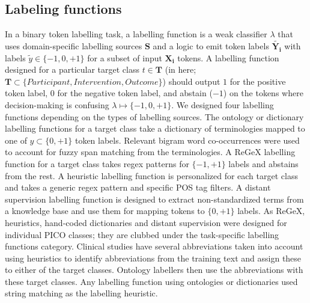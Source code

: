 \documentclass[10.7pt,]{article}
\begin{document}
\subsection{Labeling functions}\label{lfs}
%
In a binary token labelling task, a labelling function is a weak classifier $\lambda$ that uses domain-specific labelling sources $\bm{S}$ and a logic to emit token labels $ \widetilde{\bm{Y_{i}}}$ with labels $ \widetilde{y} \in \{-1, 0, +1\}$ for a subset of input $\bm{X_{i}}$ tokens.
A labelling function designed for a particular target class $t \in \bm{T}$ (in here; $\bm{T} \subset \{ Participant, Intervention, Outcome \} $) should output  $1$ for the positive token label, $0$ for the negative token label, and abstain ($-1$) on the tokens where decision-making is confusing $\lambda \mapsto \{-1, 0, +1\}$.
We designed four labelling functions depending on the types of labelling sources.
The ontology or dictionary labelling functions for a target class take a dictionary of terminologies mapped to one of $y \subset \{0, +1\} $ token labels.
Relevant bigram word co-occurrences were used to account for fuzzy span matching from the terminologies.
A ReGeX labelling function for a target class takes regex patterns for $\{-1, +1\}$ labels and abstains from the rest.
A heuristic labelling function is personalized for each target class and takes a generic regex pattern and specific POS tag filters.
A distant supervision labelling function is designed to extract non-standardized terms from a knowledge base and use them for mapping tokens to $\{0, +1\}$ labels.
As ReGeX, heuristics, hand-coded dictionaries and distant supervision were designed for individual PICO classes; they are clubbed under the task-specific labelling functions category.
Clinical studies have several abbreviations taken into account using heuristics to identify abbreviations from the training text and assign these to either of the target classes. 
Ontology labellers then use the abbreviations with these target classes.
Any labelling function using ontologies or dictionaries used string matching as the labelling heuristic.
%
%
%
\end{document}

